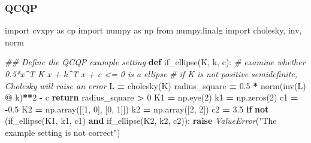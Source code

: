 \documentclass[
]{book}
\newenvironment{Shaded}{\begin{snugshade}}{\end{snugshade}}
\newcommand{\CommentTok}[1]{\textcolor[rgb]{0.56,0.35,0.01}{\textit{#1}}}
\newcommand{\ControlFlowTok}[1]{\textcolor[rgb]{0.13,0.29,0.53}{\textbf{#1}}}
\newcommand{\DecValTok}[1]{\textcolor[rgb]{0.00,0.00,0.81}{#1}}
\newcommand{\FloatTok}[1]{\textcolor[rgb]{0.00,0.00,0.81}{#1}}
\newcommand{\ImportTok}[1]{#1}
\newcommand{\KeywordTok}[1]{\textcolor[rgb]{0.13,0.29,0.53}{\textbf{#1}}}
\newcommand{\NormalTok}[1]{#1}
\newcommand{\OperatorTok}[1]{\textcolor[rgb]{0.81,0.36,0.00}{\textbf{#1}}}
\newcommand{\PreprocessorTok}[1]{\textcolor[rgb]{0.56,0.35,0.01}{\textit{#1}}}
\newcommand{\StringTok}[1]{\textcolor[rgb]{0.31,0.60,0.02}{#1}}
\theoremstyle{definition}
\theoremstyle{definition}
\theoremstyle{definition}
\theoremstyle{definition}
\theoremstyle{remark}
\begin{document}
\hypertarget{qcqp}{%
\subsubsection{QCQP}\label{qcqp}}

\begin{Shaded}
\begin{Highlighting}[]
\ImportTok{import}\NormalTok{ cvxpy }\ImportTok{as}\NormalTok{ cp}
\ImportTok{import}\NormalTok{ numpy }\ImportTok{as}\NormalTok{ np}
\ImportTok{from}\NormalTok{ numpy.linalg }\ImportTok{import}\NormalTok{ cholesky, inv, norm}

\CommentTok{\#\# Define the QCQP example setting}
\KeywordTok{def}\NormalTok{ if\_ellipse(K, k, c):}
    \CommentTok{\# examine whether 0.5*x\^{}T K x + k\^{}T x + c \textless{}= 0 is a ellipse}
    \CommentTok{\# if K is not positive semidefinite, Cholesky will raise an error}
\NormalTok{    L }\OperatorTok{=}\NormalTok{ cholesky(K) }
\NormalTok{    radius\_square }\OperatorTok{=} \FloatTok{0.5} \OperatorTok{*}\NormalTok{ norm(inv(L) }\OperatorTok{@}\NormalTok{ k)}\OperatorTok{**}\DecValTok{2} \OperatorTok{{-}}\NormalTok{ c}
    \ControlFlowTok{return}\NormalTok{ radius\_square }\OperatorTok{\textgreater{}} \DecValTok{0}
\NormalTok{K1 }\OperatorTok{=}\NormalTok{ np.eye(}\DecValTok{2}\NormalTok{)}
\NormalTok{k1 }\OperatorTok{=}\NormalTok{ np.zeros(}\DecValTok{2}\NormalTok{)}
\NormalTok{c1 }\OperatorTok{=} \OperatorTok{{-}}\FloatTok{0.5}
\NormalTok{K2 }\OperatorTok{=}\NormalTok{ np.array([[}\DecValTok{1}\NormalTok{, }\DecValTok{0}\NormalTok{], [}\DecValTok{0}\NormalTok{, }\DecValTok{1}\NormalTok{]])}
\NormalTok{k2 }\OperatorTok{=}\NormalTok{ np.array([}\DecValTok{2}\NormalTok{, }\DecValTok{2}\NormalTok{])}
\NormalTok{c2 }\OperatorTok{=} \FloatTok{3.5}
\ControlFlowTok{if} \KeywordTok{not}\NormalTok{ (if\_ellipse(K1, k1, c1) }\KeywordTok{and}\NormalTok{ if\_ellipse(K2, k2, c2)):}
    \ControlFlowTok{raise} \PreprocessorTok{ValueError}\NormalTok{(}\StringTok{"The example setting is not correct"}\NormalTok{)}


\end{Highlighting}
\end{Shaded}
\end{document}
